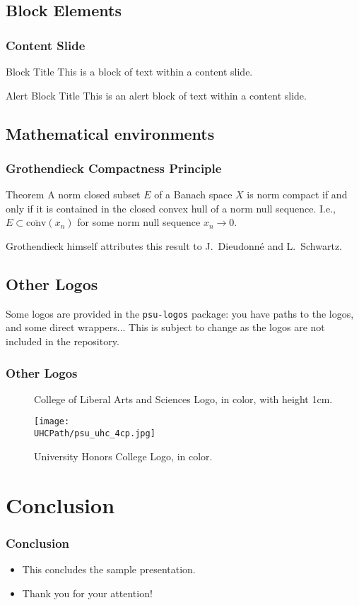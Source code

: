 \documentclass{beamer}
\begin{document}
    \subsection{Block Elements}
	\begin{frame}
		\frametitle{Content Slide}
		\begin{block}{Block Title}
			This is a block of text within a content slide.
		\end{block}
        \begin{alertblock}{Alert Block Title}
            This is an alert block of text within a content slide.
        \end{alertblock}
	\end{frame}

    \subsection{Mathematical environments}
    \begin{frame}
        \frametitle{Grothendieck Compactness Principle}
        \begin{alertblock}{Theorem}
            A norm closed subset $E$ of a Banach space $X$ is norm compact
            if and only if it is contained in the closed convex hull of a
            norm null sequence.
            I.e., $E \subset \overline{\text{conv}}(x_n)$ for some norm null
            sequence \(x_n \to 0\).
        \end{alertblock}
        Grothendieck himself attributes this result to J.~Dieudonné
        and L.~Schwartz.
    \end{frame}

    \subsection{Other Logos}
    \begin{frame}
        Some logos are provided in the \texttt{psu-logos} package: you have
        paths to the logos, and some direct wrappers...
        This is subject to change as the logos are not included in the 
        repository.
        \frametitle{Other Logos}
        \begin{figure}
            \centering
            \CLASLogoColor{1cm}
            \caption{College of Liberal Arts and Sciences Logo, in color,
            with height 1cm.}
        \end{figure}
        \begin{figure}
            \centering
            \texttt{[image: \\UHCPath/psu\_uhc\_4cp.jpg]}
            \caption{University Honors College Logo, in color.}
        \end{figure}
    \end{frame}

    \section{Conclusion}
	\begin{frame}
		\frametitle{Conclusion}
		\begin{itemize}
			\item This concludes the sample presentation.

			\item Thank you for your attention!
		\end{itemize}
	\end{frame}
\end{document}
